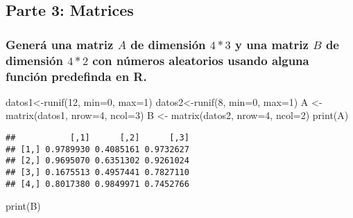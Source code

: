 \documentclass[
]{article}
\newenvironment{Shaded}{\begin{snugshade}}{\end{snugshade}}
\newcommand{\AttributeTok}[1]{\textcolor[rgb]{0.77,0.63,0.00}{#1}}
\newcommand{\DecValTok}[1]{\textcolor[rgb]{0.00,0.00,0.81}{#1}}
\newcommand{\FunctionTok}[1]{\textcolor[rgb]{0.00,0.00,0.00}{#1}}
\newcommand{\NormalTok}[1]{#1}
\newcommand{\OtherTok}[1]{\textcolor[rgb]{0.56,0.35,0.01}{#1}}
\begin{document}
\hypertarget{parte-3-matrices}{%
\subsection{Parte 3: Matrices}\label{parte-3-matrices}}

\hypertarget{generuxe1-una-matriz-a-de-dimensiuxf3n-43-y-una-matriz-b-de-dimensiuxf3n-42-con-nuxfameros-aleatorios-usando-alguna-funciuxf3n-predefinda-en-r.}{%
\subsubsection{\texorpdfstring{Generá una matriz \(A\) de dimensión
\(4*3\) y una matriz \(B\) de dimensión \(4*2\) con números aleatorios
usando alguna función predefinda en
R.}{Generá una matriz A de dimensión 4*3 y una matriz B de dimensión 4*2 con números aleatorios usando alguna función predefinda en R.}}\label{generuxe1-una-matriz-a-de-dimensiuxf3n-43-y-una-matriz-b-de-dimensiuxf3n-42-con-nuxfameros-aleatorios-usando-alguna-funciuxf3n-predefinda-en-r.}}

\begin{Shaded}
\begin{Highlighting}[]
\NormalTok{datos1}\OtherTok{\textless{}{-}}\FunctionTok{runif}\NormalTok{(}\DecValTok{12}\NormalTok{, }\AttributeTok{min=}\DecValTok{0}\NormalTok{, }\AttributeTok{max=}\DecValTok{1}\NormalTok{)}
\NormalTok{datos2}\OtherTok{\textless{}{-}}\FunctionTok{runif}\NormalTok{(}\DecValTok{8}\NormalTok{, }\AttributeTok{min=}\DecValTok{0}\NormalTok{, }\AttributeTok{max=}\DecValTok{1}\NormalTok{)}
\NormalTok{A }\OtherTok{\textless{}{-}} \FunctionTok{matrix}\NormalTok{(datos1, }\AttributeTok{nrow=}\DecValTok{4}\NormalTok{, }\AttributeTok{ncol=}\DecValTok{3}\NormalTok{)}
\NormalTok{B }\OtherTok{\textless{}{-}} \FunctionTok{matrix}\NormalTok{(datos2, }\AttributeTok{nrow=}\DecValTok{4}\NormalTok{, }\AttributeTok{ncol=}\DecValTok{2}\NormalTok{)}
\FunctionTok{print}\NormalTok{(A)}
\end{Highlighting}
\end{Shaded}

\begin{verbatim}
##           [,1]      [,2]      [,3]
## [1,] 0.9789930 0.4085161 0.9732627
## [2,] 0.9695070 0.6351302 0.9261024
## [3,] 0.1675513 0.4957441 0.7827110
## [4,] 0.8017380 0.9849971 0.7452766
\end{verbatim}

\begin{Shaded}
\begin{Highlighting}[]
\FunctionTok{print}\NormalTok{(B)}
\end{Highlighting}
\end{Shaded}
\end{document}
